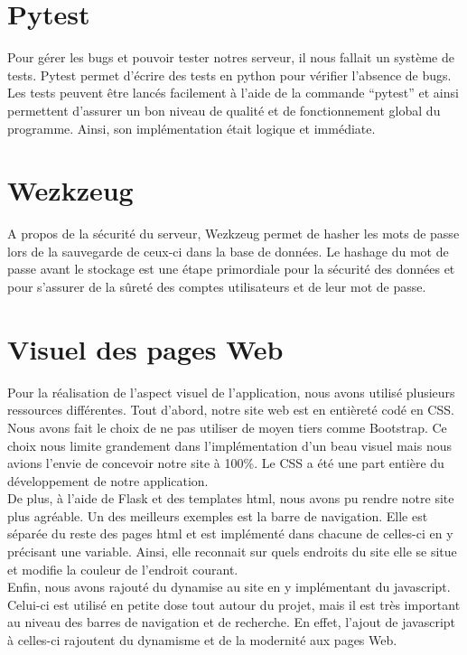 \documentclass[12pt,titlepage]{report}
\begin{document}
\section{Pytest}

Pour gérer les bugs et pouvoir tester notres serveur, il nous fallait un système de tests. Pytest permet d’écrire des tests en python pour vérifier l’absence de bugs. Les tests peuvent être lancés facilement à l’aide de la commande “pytest” et ainsi permettent d’assurer un bon niveau de qualité et de fonctionnement global du programme. Ainsi, son implémentation était logique et immédiate.

\section{Wezkzeug}

A propos de la sécurité du serveur, Wezkzeug permet de hasher les mots de passe lors de la sauvegarde de ceux-ci dans la base de données. Le hashage du mot de passe avant le stockage est une étape primordiale pour la sécurité des données et pour s’assurer de la sûreté des comptes utilisateurs et de leur mot de passe.

\section{Visuel des pages Web}
Pour la réalisation de l’aspect visuel de l’application, nous avons utilisé plusieurs ressources différentes. Tout d’abord, notre site web est en entièreté codé en CSS. Nous avons fait le choix de ne pas utiliser de moyen tiers comme Bootstrap. Ce choix nous limite grandement dans l’implémentation d’un beau visuel mais nous avions l’envie de concevoir notre site à 100\%. Le CSS a été une part entière du développement de notre application. \\

De plus, à l’aide de Flask et des templates html, nous avons pu rendre notre site plus agréable. Un des meilleurs exemples est la barre de navigation. Elle est séparée du reste des pages html et est implémenté dans chacune de celles-ci en y précisant une variable. Ainsi, elle reconnait sur quels endroits du site elle se situe et modifie la couleur de l’endroit courant. \\

Enfin, nous avons rajouté du dynamise au site en y implémentant du javascript. Celui-ci est utilisé en petite dose tout autour du projet, mais il est très important au niveau des barres de navigation et de recherche. En effet, l’ajout de javascript à celles-ci rajoutent du dynamisme et de la modernité aux pages Web. 
\end{document}
